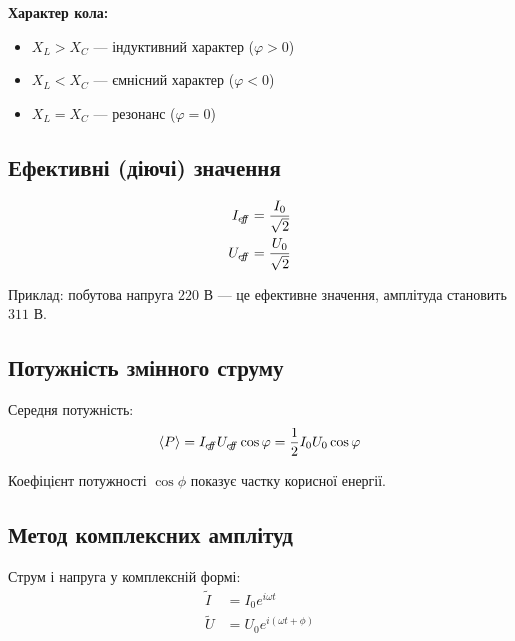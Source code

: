 \begin{Theory}
	\textbf{Характер кола:}
	\begin{itemize}
		\item $X_L > X_C$ --- індуктивний характер ($\varphi > 0$)
		\item $X_L < X_C$ --- ємнісний характер ($\varphi < 0$)
		\item $X_L = X_C$ --- резонанс ($\varphi = 0$)
	\end{itemize}

	\subsection*{Ефективні (діючі) значення}

	\begin{align}
		I_{e\kern-2.2pt f\kern-3pt f} & = \frac{I_0}{\sqrt{2}} \\
		U_{e\kern-2.2pt f\kern-3pt f} & = \frac{U_0}{\sqrt{2}}
	\end{align}

	Приклад: побутова напруга $220$ В --- це ефективне значення, амплітуда становить $311$ В.

	\subsection*{Потужність змінного струму}

	Середня потужність:
	\begin{equation}
		\left\langle P\right\rangle = I_{e\kern-2.2pt f\kern-3pt f} U_{e\kern-2.2pt f\kern-3pt f} \cos\varphi = \frac{1}{2} I_0 U_0 \cos\varphi
	\end{equation}

	Коефіцієнт потужності $\cos\phi$ показує частку корисної енергії.

	\subsection*{Метод комплексних амплітуд}

	Струм і напруга у комплексній формі:
	\begin{align}
		\tilde{I} & = I_0 e^{i\omega t}          \\
		\tilde{U} & = U_0 e^{i(\omega t + \phi)}
	\end{align}


\end{Theory}
